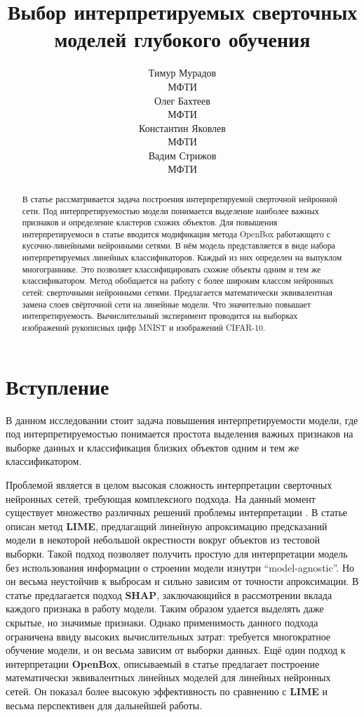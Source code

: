 \documentclass[12pt]{article}
\title{Выбор интерпретируемых сверточных моделей глубокого обучения}
\author{ Тимур Мурадов\\
	МФТИ\\
	\And
	Олег Бахтеев \\
	МФТИ\\
	\And
	Константин Яковлев \\
	МФТИ\\
	\And
	Вадим Стрижов \\
	МФТИ\\
}
\date{}
\begin{document}
\maketitle

\begin{abstract}
	В статье рассматривается задача построения интерпретируемой сверточной нейронной сети. Под интерпретируемостью модели понимается выделение наиболее важных признаков и определение кластеров схожих объектов. Для повышения интерпретируемоси в статье вводится модификация метода OpenBox работающего с  кусочно-линейными нейронными сетями. В нём модель представляется в виде набора интерпретируемых линейных классификаторов. Каждый из них определен на выпуклом многограннике. Это позволяет классифицировать схожие объекты одним и тем же классификатором. Метод обобщается на работу с более широким классом нейронных сетей: сверточными нейронными сетями. Предлагается математически эквивалентная замена слоев свёрточной сети на линейные модели. Что  значительно повышает интепретируемость. Вычислительный эксперимент проводится на выборках изображений рукописных цифр MNIST и изображений CIFAR-10.
\end{abstract}



\section{Вступление}
В данном исследовании стоит задача повышения интерпретируемости модели, где под интерпретируемостью понимается простота выделения важных признаков на выборке данных и классификация близких объектов одним и тем же классификатором.

Проблемой является в целом высокая сложность интерпретации сверточных нейронных сетей, требующая комплексного подхода. На данный момент существует множество различных решений проблемы интерпретации \cite{ribeiro2016why, Lundberg2017aunified, chu2019exact} . В статье \cite{ribeiro2016why} описан метод \textbf{LIME}, предлагащий линейную апроксимацию предсказаний модели в некоторой небольшой окрестности вокруг объектов из тестовой выборки. Такой подход позволяет получить простую для интерпретации модель без использования информации о строении модели изнутри \textquotedblleft model-agnostic\textquotedblright. Но он весьма неустойчив к выбросам и сильно зависим от точности апроксимации. В статье \cite{Lundberg2017aunified} предлагается подход \textbf{SHAP}, заключающийся в рассмотрении вклада каждого признака в работу модели. Таким образом удается выделять даже скрытые, но значимые признаки. Однако применимость данного подхода ограничена ввиду высоких вычислительных затрат: требуется многократное обучение модели, и он весьма зависим от выборки данных. Ещё один подход к интерпретации \textbf{OpenBox}, описываемый в статье \cite{chu2019exact} предлагает построение математически эквивалентных линейных моделей для линейных нейронных сетей. Он показал более высокую эффективность по сравнению с \textbf{LIME} и весьма перспективен для дальнейшей работы.
\end{document}
